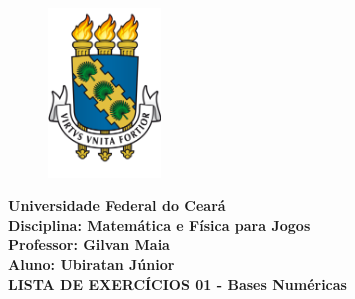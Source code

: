 \documentclass{abntex2}
\begin{document}
  \begin{center}
    \begin{figure}[h]
      \centering
      \includegraphics[width=3cm]{logo-ufc.PNG}
    \end{figure}
    \textbf{
      Universidade Federal do Ceará\\
      Disciplina: Matemática e Física para Jogos \\
      Professor: Gilvan Maia \\
      Aluno: Ubiratan Júnior \\
      LISTA DE EXERCÍCIOS 01 - Bases Numéricas
    }
  \end{center}
\end{document}
